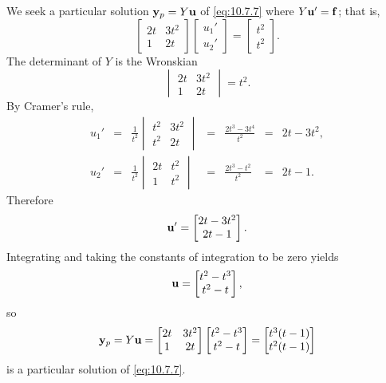 \documentclass{ximera}
\begin{document}
\begin{example}
\begin{explanation}
We seek a particular solution ${\bf y}_p=Y{\bf u}$ of \eqref{eq:10.7.7}
where $Y{\bf u}'={\bf f}$; that is,
$$
\begin{bmatrix}2t&3t^2\\1&2t\end{bmatrix}\begin{bmatrix}u_1'\\u_2'\end{bmatrix}
=\begin{bmatrix}t^2\\t^2\end{bmatrix}.
$$
The determinant of $Y$  is the Wronskian
$$
\begin{vmatrix}2t&3t^2\\1&2t\end{vmatrix}=t^2.
$$
By Cramer's rule,
$$
\begin{array}{ccccccl}
u_1'&=&\frac{1}{t^2}\begin{vmatrix}t^2&3t^2\\t^2&2t
\end{vmatrix}&=&\frac{2t^3-3t^4}{t^2}&=&2t-3t^2,
\\
u_2'&=&\frac{1}{t^2}\begin{vmatrix}2t&t^2\\1&t^2
\end{vmatrix}&=&\frac{2t^3-t^2}{t^2}&=&2t-1.
\end{array}
$$
Therefore
$$
{\bf u}'=\begin{bmatrix}2t-3t^2\\2t-1\end{bmatrix}.
$$
Integrating  and taking the constants of integration to be zero yields
$$
{\bf u}=\begin{bmatrix}t^2-t^3\\t^2-t
\end{bmatrix},
$$
so
$$
{\bf y}_p=Y{\bf u}=
\begin{bmatrix}2t&3t^2\\1&2t\end{bmatrix}
\begin{bmatrix}t^2-t^3\\t^2-t\end{bmatrix}
=\begin{bmatrix}t^3(t-1)\\t^2(t-1)\end{bmatrix}
$$
is a particular solution of  \eqref{eq:10.7.7}.
\end{explanation}
\end{example}
\end{document}
